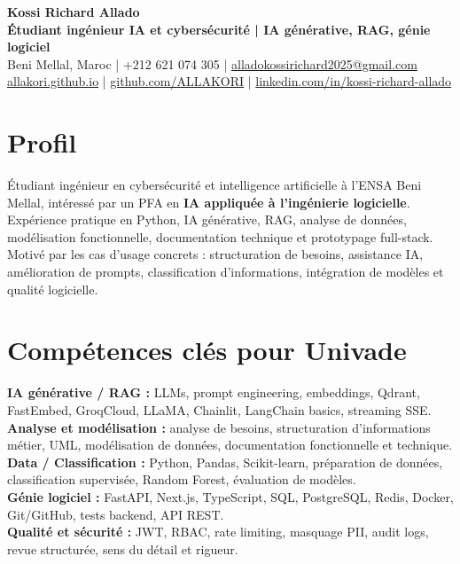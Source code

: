 \documentclass[10pt,a4paper]{article}
\begin{document}
{\Large \textbf{Kossi Richard Allado}}\\
\textbf{Étudiant ingénieur IA et cybersécurité | IA générative, RAG, génie logiciel}\\
Beni Mellal, Maroc | +212 621 074 305 | \href{mailto:alladokossirichard2025@gmail.com}{alladokossirichard2025@gmail.com}\\
\href{https://allakori.github.io/}{allakori.github.io} | \href{https://github.com/ALLAKORI}{github.com/ALLAKORI} | \href{https://www.linkedin.com/in/kossi-richard-allado-50177b2a5}{linkedin.com/in/kossi-richard-allado}

\section{Profil}
Étudiant ingénieur en cybersécurité et intelligence artificielle à l'ENSA Beni Mellal, intéressé par un PFA en \textbf{IA appliquée à l'ingénierie logicielle}. Expérience pratique en Python, IA générative, RAG, analyse de données, modélisation fonctionnelle, documentation technique et prototypage full-stack. Motivé par les cas d'usage concrets : structuration de besoins, assistance IA, amélioration de prompts, classification d'informations, intégration de modèles et qualité logicielle.

\section{Compétences clés pour Univade}
\textbf{IA générative / RAG :} LLMs, prompt engineering, embeddings, Qdrant, FastEmbed, GroqCloud, LLaMA, Chainlit, LangChain basics, streaming SSE.\\
\textbf{Analyse et modélisation :} analyse de besoins, structuration d'informations métier, UML, modélisation de données, documentation fonctionnelle et technique.\\
\textbf{Data / Classification :} Python, Pandas, Scikit-learn, préparation de données, classification supervisée, Random Forest, évaluation de modèles.\\
\textbf{Génie logiciel :} FastAPI, Next.js, TypeScript, SQL, PostgreSQL, Redis, Docker, Git/GitHub, tests backend, API REST.\\
\textbf{Qualité et sécurité :} JWT, RBAC, rate limiting, masquage PII, audit logs, revue structurée, sens du détail et rigueur.
\end{document}
